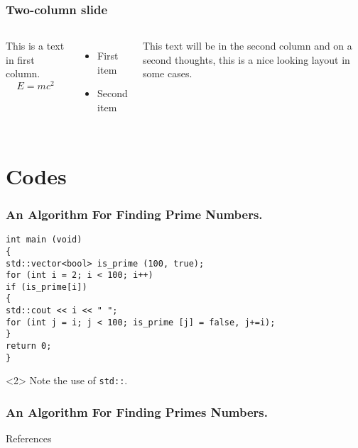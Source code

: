\begin{frame}
\frametitle{Two-column slide}
\begin{columns}
This is a text in first column. \cite{mertens_emerging_2015}
$$E=mc^2$$
\begin{itemize}
\item First item
\item Second item
\end{itemize}

This text will be in the second column\cite{qin_recurrent_2016}
and on a second thoughts, this is a nice looking
layout in some cases.
\end{columns}
\end{frame}

\section{Codes}
\begin{frame}[fragile]
\frametitle{An Algorithm For Finding Prime Numbers.}
\begin{verbatim}
int main (void)
{
std::vector<bool> is_prime (100, true);
for (int i = 2; i < 100; i++)
if (is_prime[i])
{
std::cout << i << " ";
for (int j = i; j < 100; is_prime [j] = false, j+=i);
}
return 0;
}
\end{verbatim}
\begin{uncoverenv}<2>
Note the use of \verb|std::|.
\end{uncoverenv}
\end{frame}


\begin{frame}[fragile]
\frametitle{An Algorithm For Finding Primes Numbers.}
\begin{semiverbatim}
\end{semiverbatim}
\end{frame}


\begin{frame}[allowframebreaks]{References}

    
\end{frame}

